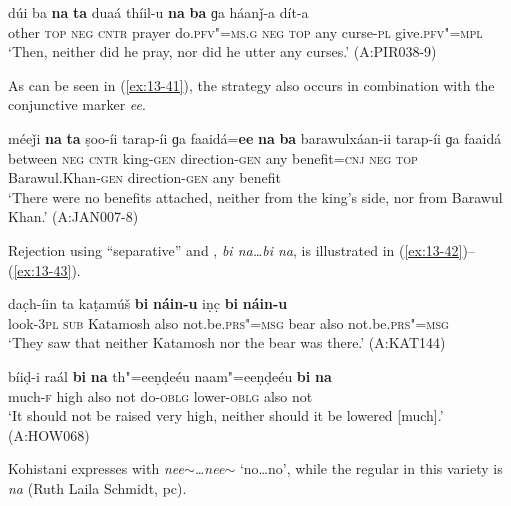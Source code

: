 \ex
\label{ex:13-40}
\gll dúi ba {\ob}\textbf{na} \textbf{ta} duaá thíil-u \textbf{na} \textbf{ba} ɡa háanǰ-a dít-a{\cb}\\
other \textsc{top} \textsc{neg} \textsc{cntr} prayer do.\textsc{pfv"=ms.g} \textsc{neg} \textsc{top} any curse-\textsc{pl} give.\textsc{pfv"=mpl}\\
\glt `Then, neither did he pray, nor did he utter any curses.' (A:PIR038-9) 
\z

As can be seen in (\ref{ex:13-41}), the strategy also occurs in combination with the conjunctive marker \textit{ee}.

\begin{exe}
\ex
\label{ex:13-41}
\gll méeǰi {\ob}\textbf{na} \textbf{ta} ṣoo-íi tarap-íi ɡa faaidá=\textbf{ee} \textbf{na} \textbf{ba} barawulxáan-ii tarap-íi ɡa faaidá{\cb}\\
between \textsc{neg} \textsc{cntr} king-\textsc{gen} direction-\textsc{gen} any benefit=\textsc{cnj} \textsc{neg} \textsc{top} Barawul.Khan-\textsc{gen} direction-\textsc{gen} any benefit  \\
\glt `There were no benefits attached, neither from the king's side, nor from Barawul Khan.' (A:JAN007-8) 
\end{exe}

Rejection using ``separative''  and , \textit{bi na{\ldots}bi na}, is illustrated in (\ref{ex:13-42})--(\ref{ex:13-43}).

\begin{exe}
\ex
\label{ex:13-42}
\gll dac̣h-íin ta {\ob}kaṭamúš \textbf{bi} \textbf{náin-u} iṇc̣ \textbf{bi} \textbf{náin-u}{\cb}\\
look-\textsc{3pl} \textsc{sub} Katamosh also not.be.\textsc{prs"=msg} bear also not.be.\textsc{prs"=msg} \\
\glt `They saw that neither Katamosh nor the bear was there.' (A:KAT144)

\ex
\label{ex:13-43}
\gll bíiḍ-i raál \textbf{bi} \textbf{na} th"=eeṇḍeéu naam"=eeṇḍeéu \textbf{bi} \textbf{na} \\
much-\textsc{f} high also not do-\textsc{oblg} lower-\textsc{oblg} also not  \\
\glt `It should not be raised very high, neither should it be lowered [much].' (A:HOW068) 
\end{exe}

Kohistani \iliShina expresses  with \textit{nee$\sim${\ldots}nee$\sim$} `no{\ldots}no', while the regular   in this variety is \textit{na} (Ruth Laila Schmidt, pc).


